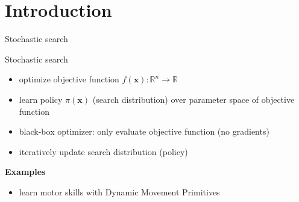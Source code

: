 \documentclass[navbarinfooter, 12pt]{sdqbeamer}
\begin{document}

\section{Introduction}

\begin{frame}{Stochastic search}
  \begin{block}{Stochastic search}
    \begin{itemize}
    \item optimize objective function $f(\mathbf{x}): \mathbb{R}^n \rightarrow \mathbb{R}$
    \item learn policy $\pi(\mathbf{x})$ (search distribution) over parameter space of objective function
    \item black-box optimizer: only evaluate objective function (no gradients)
    \item iteratively update search distribution (policy)
    \end{itemize}
  \end{block}
\textbf{Examples} \\
    \begin{itemize}
    \item learn motor skills with Dynamic Movement Primitives
    \end{itemize}
\end{frame}
\end{document}
